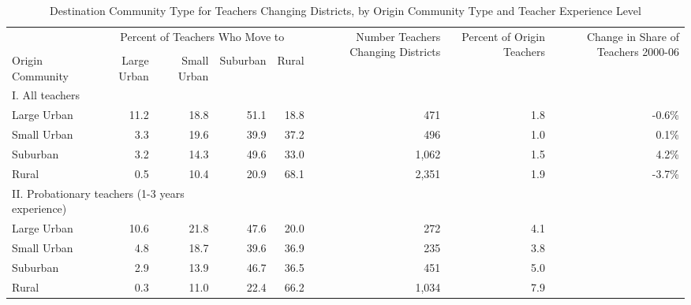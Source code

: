 \documentclass[12pt,]{article}
\begin{document}
\begin{sidewaystable}[htbp]
\centering
\begin{tabular}{lrrrrrrr}
  \hline
 & \multicolumn{4}{c}{\multirow{2}{*}{Percent of Teachers Who Move to}} & \multirow{4}{*}{\parbox{0.09\linewidth}{Number Teachers Changing Districts}} & \multirow{4}{*}{\parbox{0.07\linewidth}{Percent of Origin Teachers}} & \multirow{4}{*}{\parbox{0.07\linewidth}{Change in Share of Teachers 2000-06}}\\
 & \multicolumn{4}{c}{} & & & \\ \cline{2-5}
& & & & & & & \\
Origin Community & Large Urban & Small Urban & Suburban & Rural &  &  &  \\ 
  \hline
I. All teachers & & & & & & & \\
\quad Large Urban & 11.2 & 18.8 & 51.1 & 18.8 & 471 & 1.8 & -0.6\% \\ 
  \quad Small Urban & 3.3 & 19.6 & 39.9 & 37.2 & 496 & 1.0 & 0.1\% \\ 
  \quad Suburban & 3.2 & 14.3 & 49.6 & 33.0 & 1,062 & 1.5 & 4.2\% \\ 
  \quad Rural & 0.5 & 10.4 & 20.9 & 68.1 & 2,351 & 1.9 & -3.7\% \\ 
\multicolumn{3}{l}{II. Probationary teachers (1-3 years experience)} & & & & & \\
  \quad Large Urban & 10.6 & 21.8 & 47.6 & 20.0 & 272 & 4.1 &  \\ 
  \quad Small Urban & 4.8 & 18.7 & 39.6 & 36.9 & 235 & 3.8 &  \\ 
  \quad Suburban & 2.9 & 13.9 & 46.7 & 36.5 & 451 & 5.0 &  \\ 
  \quad Rural & 0.3 & 11.0 & 22.4 & 66.2 & 1,034 & 7.9 &  \\ 
   \hline
\end{tabular}
\caption{Destination Community Type for Teachers Changing Districts, by Origin Community Type and Teacher Experience Level} 
\label{tbl:markov}
\end{sidewaystable}
\end{document}
